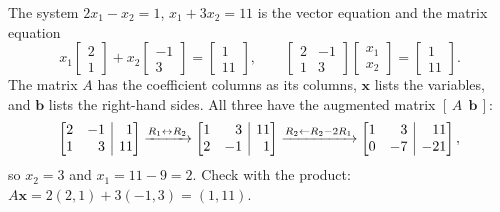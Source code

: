 \documentclass[10pt]{scrartcl}
\makeatletter
\newcommand{\aug}[2]{\left[\begin{array}{@{}#1@{}}#2\end{array}\right]}
\newcommand{\vv}[1]{\mathbf{#1}}
\makeatother
\begin{document}
\begin{example*}
The system $2x_1-x_2=1$, $x_1+3x_2=11$ is the vector equation and the matrix equation
\[
  x_1\begin{bmatrix}2\\1\end{bmatrix}+x_2\begin{bmatrix}-1\\3\end{bmatrix}=\begin{bmatrix}1\\11\end{bmatrix},
  \qquad
  \begin{bmatrix}2&-1\\1&3\end{bmatrix}\begin{bmatrix}x_1\\x_2\end{bmatrix}=\begin{bmatrix}1\\11\end{bmatrix}.
\]
The matrix $A$ has the coefficient columns as its columns, $\vv x$ lists the variables, and $\vv b$ lists the right-hand sides. All three have the augmented matrix $[\,A\ \ \vv b\,]$:
\[
  \aug{rr|r}{2&-1&1\\1&3&11}
  \xrightarrow{R_1\leftrightarrow R_2}
  \aug{rr|r}{1&3&11\\2&-1&1}
  \xrightarrow{R_2\leftarrow R_2-2R_1}
  \aug{rr|r}{1&3&11\\0&-7&-21},
\]
so $x_2=3$ and $x_1=11-9=2$. Check with the product: $A\vv x=2(2,1)+3(-1,3)=(1,11)$.
\end{example*}
\end{document}
